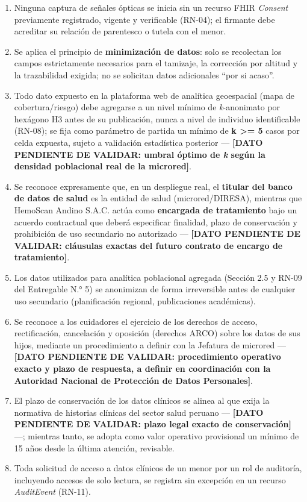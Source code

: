 \documentclass[11pt,a4paper]{article}
\providecommand{\tightlist}{%
  \setlength{\itemsep}{0pt}\setlength{\parskip}{0pt}}
\begin{document}
\begin{enumerate}
\def\labelenumi{\arabic{enumi}.}
\tightlist
\item
  Ninguna captura de señales ópticas se inicia sin un recurso FHIR \emph{Consent} previamente registrado, vigente y verificable (RN-04); el firmante debe acreditar su relación de parentesco o tutela con el menor.
\item
  Se aplica el principio de \textbf{minimización de datos}: solo se recolectan los campos estrictamente necesarios para el tamizaje, la corrección por altitud y la trazabilidad exigida; no se solicitan datos adicionales ``por si acaso''.
\item
  Todo dato expuesto en la plataforma web de analítica geoespacial (mapa de cobertura/riesgo) debe agregarse a un nivel mínimo de \emph{k}-anonimato por hexágono H3 antes de su publicación, nunca a nivel de individuo identificable (RN-08); se fija como parámetro de partida un mínimo de \textbf{k \textgreater= 5} casos por celda expuesta, sujeto a validación estadística posterior --- \textbf{{[}DATO PENDIENTE DE VALIDAR: umbral óptimo de \emph{k} según la densidad poblacional real de la microred{]}}.
\item
  Se reconoce expresamente que, en un despliegue real, el \textbf{titular del banco de datos de salud} es la entidad de salud (microred/DIRESA), mientras que HemoScan Andino S.A.C. actúa como \textbf{encargada de tratamiento} bajo un acuerdo contractual que deberá especificar finalidad, plazo de conservación y prohibición de uso secundario no autorizado --- \textbf{{[}DATO PENDIENTE DE VALIDAR: cláusulas exactas del futuro contrato de encargo de tratamiento{]}}.
\item
  Los datos utilizados para analítica poblacional agregada (Sección 2.5 y RN-09 del Entregable N.° 5) se anonimizan de forma irreversible antes de cualquier uso secundario (planificación regional, publicaciones académicas).
\item
  Se reconoce a los cuidadores el ejercicio de los derechos de acceso, rectificación, cancelación y oposición (derechos ARCO) sobre los datos de sus hijos, mediante un procedimiento a definir con la Jefatura de microred --- \textbf{{[}DATO PENDIENTE DE VALIDAR: procedimiento operativo exacto y plazo de respuesta, a definir en coordinación con la Autoridad Nacional de Protección de Datos Personales{]}}.
\item
  El plazo de conservación de los datos clínicos se alinea al que exija la normativa de historias clínicas del sector salud peruano --- \textbf{{[}DATO PENDIENTE DE VALIDAR: plazo legal exacto de conservación{]}} ---; mientras tanto, se adopta como valor operativo provisional un mínimo de 15 años desde la última atención, revisable.
\item
  Toda solicitud de acceso a datos clínicos de un menor por un rol de auditoría, incluyendo accesos de solo lectura, se registra sin excepción en un recurso \emph{AuditEvent} (RN-11).
\end{enumerate}
\end{document}
